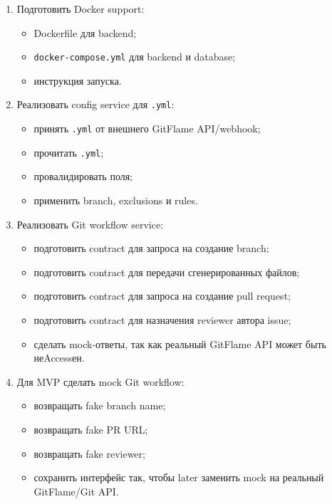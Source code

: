 \documentclass[12pt,a4paper]{article}
\begin{document}
\begin{enumerate}
    \item Подготовить Docker support:
    \begin{itemize}
        \item Dockerfile для backend;
        \item \texttt{docker-compose.yml} для backend и database;
        \item инструкция запуска.
    \end{itemize}

    \item Реализовать config service для \texttt{.yml}:
    \begin{itemize}
        \item принять \texttt{.yml} от внешнего GitFlame API/webhook;
        \item прочитать \texttt{.yml};
        \item провалидировать поля;
        \item применить branch, exclusions и rules.
    \end{itemize}

    \item Реализовать Git workflow service:
    \begin{itemize}
        \item подготовить contract для запроса на создание branch;
        \item подготовить contract для передачи сгенерированных файлов;
        \item подготовить contract для запроса на создание pull request;
        \item подготовить contract для назначения reviewer автора issue;
        \item сделать mock-ответы, так как реальный GitFlame API может быть неAccessен.
    \end{itemize}

    \item Для MVP сделать mock Git workflow:
    \begin{itemize}
        \item возвращать fake branch name;
        \item возвращать fake PR URL;
        \item возвращать fake reviewer;
        \item сохранить интерфейс так, чтобы later заменить mock на реальный GitFlame/Git API.
    \end{itemize}
\end{enumerate}
\end{document}
